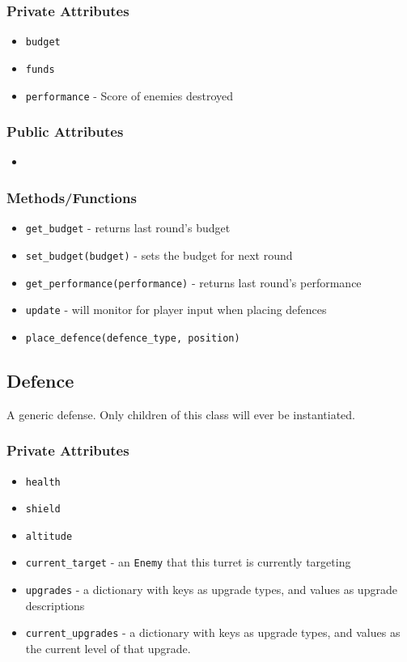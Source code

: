 \documentclass[12pt]{article}
\begin{document}
\subsubsection*{Private Attributes}
\begin{itemize}
\item \texttt{budget}
\item \texttt{funds}
\item \texttt{performance} - Score of enemies destroyed
\end{itemize}
\subsubsection*{Public Attributes}
\begin{itemize}
\item 
\end{itemize}
\subsubsection*{Methods/Functions}
\begin{itemize}
\item \texttt{get\_budget} - returns last round's budget
\item \texttt{set\_budget(budget)} - sets the budget for next round
\item \texttt{get\_performance(performance)} - returns last round's performance
\item \texttt{update} - will monitor for player input when placing defences
\item \texttt{place\_defence(defence\_type, position)}
\end{itemize}


\subsection*{Defence} A generic defense. Only children of this class will ever
be instantiated.
\subsubsection*{Private Attributes}
\begin{itemize}
\item \texttt{health}
\item \texttt{shield}
\item \texttt{altitude}
\item \texttt{current\_target} - an \texttt{Enemy} that this turret is currently
targeting
\item \texttt{upgrades} - a dictionary with keys as upgrade types, and values as
upgrade descriptions
\item \texttt{current\_upgrades} - a dictionary with keys as upgrade types, and
values as the current level of that upgrade.
\end{itemize}
\end{document}
